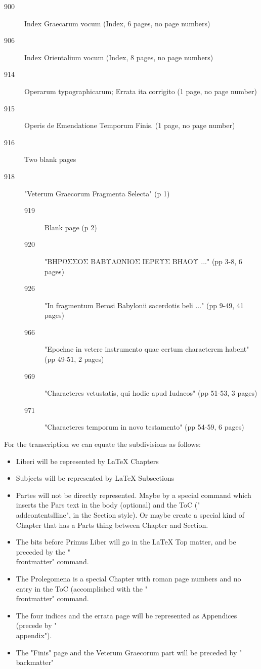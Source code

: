\documentclass{report}
\begin{document}
\begin{description}
\item[900] Index Graecarum vocum (Index, 6 pages, no page numbers)
\item[906] Index Orientalium vocum (Index,  8 pages, no page numbers)
\item[914] Operarum typographicarum; Errata ita corrigito (1 page, no page number)
\item[915] Operis de Emendatione Temporum Finis. (1 page, no page number)
\item[916] Two blank pages
\item[918] "Veterum Graecorum Fragmenta Selecta" (p 1)
\begin{description}
  \item[919] Blank page (p 2)
  \item[920] "ΒΗΡΩΣΣΟΣ ΒΑΒΥΛΩΝΙΟΣ ΙΕΡΕΥΣ ΒΗΛΟΥ ..." (pp 3-8, 6 pages)
  \item[926] "In fragmentum Berosi Babylonii sacerdotis beli ..." (pp 9-49, 41 pages)
  \item[966] "Epochae in vetere instrumento quae certum characterem habent" (pp 49-51, 2 pages)
  \item[969] "Characteres vetustatis, qui hodie apud Iudaeos" (pp 51-53, 3 pages)
  \item[971] "Characteres temporum in novo testamento" (pp 54-59, 6 pages)
\end{description}
\end{description}

For the transcription we can equate the subdivisions as follows:
\begin{itemize}
\item Liberi will be represented by LaTeX Chapters
\item Subjects will be represented by LaTeX Subsections
\item Partes will not be directly represented. Maybe by a special command which inserts the Pars text in the body (optional) and the ToC ("\\addcontentslline", in the Section style). Or maybe create a special kind of Chapter that has a Parts thing between Chapter and Section.
\item The bits before Primus Liber will go in the LaTeX Top matter, and be preceded by the "\\frontmatter" command.
\item The Prolegomena is a special Chapter with roman page numbers and no entry in the ToC (accomplished with the "\\frontmatter" command.
\item The four indices and the errata page will be represented as Appendices (precede by "\\appendix").
\item The "Finis" page and the Veterum Graecorum part will be preceded by "\\backmatter"
\end{itemize}
\end{document}
